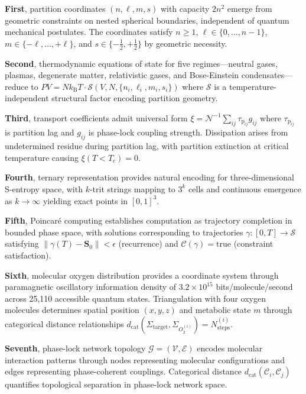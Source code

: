 \documentclass[12pt,a4paper]{article}
\theoremstyle{plain}
\theoremstyle{definition}
\theoremstyle{remark}
\newcommand{\kB}{k_{\mathrm{B}}}
\newcommand{\Sspace}{\mathcal{S}}
\newcommand{\Scoord}{\mathbf{S}}
\newcommand{\dcat}{d_{\mathrm{cat}}}
\newcommand{\taulag}{\tau_{\mathrm{p}}}
\begin{document}
\textbf{First}, partition coordinates $(n,\ell,m,s)$ with capacity $2n^2$ emerge from geometric constraints on nested spherical boundaries, independent of quantum mechanical postulates. The coordinates satisfy $n \geq 1$, $\ell \in \{0,\ldots,n-1\}$, $m \in \{-\ell,\ldots,+\ell\}$, and $s \in \{-\tfrac{1}{2},+\tfrac{1}{2}\}$ by geometric necessity.

\textbf{Second}, thermodynamic equations of state for five regimes—neutral gases, plasmas, degenerate matter, relativistic gases, and Bose-Einstein condensates—reduce to $PV = N\kB T \cdot \mathcal{S}(V,N,\{n_i,\ell_i,m_i,s_i\})$ where $\mathcal{S}$ is a temperature-independent structural factor encoding partition geometry.

\textbf{Third}, transport coefficients admit universal form $\xi = \mathcal{N}^{-1} \sum_{ij} \taulag_{ij} g_{ij}$ where $\taulag_{ij}$ is partition lag and $g_{ij}$ is phase-lock coupling strength. Dissipation arises from undetermined residue during partition lag, with partition extinction at critical temperature causing $\xi(T < T_c) = 0$.

\textbf{Fourth}, ternary representation provides natural encoding for three-dimensional S-entropy space, with $k$-trit strings mapping to $3^k$ cells and continuous emergence as $k \to \infty$ yielding exact points in $[0,1]^3$.

\textbf{Fifth}, Poincaré computing establishes computation as trajectory completion in bounded phase space, with solutions corresponding to trajectories $\gamma: [0,T] \to \Sspace$ satisfying $\|\gamma(T) - \Scoord_0\| < \epsilon$ (recurrence) and $\mathcal{C}(\gamma) = \text{true}$ (constraint satisfaction).

\textbf{Sixth}, molecular oxygen distribution provides a coordinate system through paramagnetic oscillatory information density of $3.2 \times 10^{15}$ bits/molecule/second across 25,110 accessible quantum states. Triangulation with four oxygen molecules determines spatial position $(x,y,z)$ and metabolic state $m$ through categorical distance relationships $\dcat(\Sigma_{\text{target}}, \Sigma_{O_2^{(i)}}) = N_{\text{steps}}^{(i)}$.

\textbf{Seventh}, phase-lock network topology $\mathcal{G} = (\mathcal{V}, \mathcal{E})$ encodes molecular interaction patterns through nodes representing molecular configurations and edges representing phase-coherent couplings. Categorical distance $\dcat(\mathcal{C}_i,\mathcal{C}_j)$ quantifies topological separation in phase-lock network space.
\end{document}
